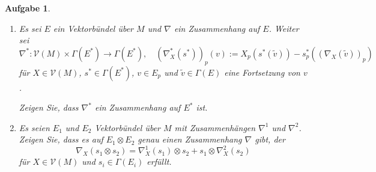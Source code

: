 \documentclass[paper=A4, twoside, chapterprefix=true, bibliography=totoc, headsepline]{scrbook}
\newcommand{\tensor}{\otimes}
\theoremstyle{plain}
\theoremstyle{nonumberplain}
\theoremstyle{empty}
\theoremstyle{break}
\newtheorem{Aufg}{Aufgabe}
\begin{document}
\begin{Aufg}
\begin{enumerate}[label=\alph*),leftmargin=*,widest=b]
\item
	Es sei $E$ ein Vektorbündel über $M$ und $\nabla$ ein Zusammenhang auf $E$. Weiter sei 
		\[\nabla^*:\mathcal{V}(M)\times \Gamma(E^*) \to \Gamma(E^*), \quad (\nabla^*_X(s^*))_p(v):=X_p(s^*(\tilde{v}))-s^*_p((\nabla_X(\tilde{v}))_p)\]
	für $X\in \mathcal{V}(M)$, $s^* \in \Gamma(E^*)$, $v \in E_p$ und $\tilde{v}\in \Gamma(E)$ eine Fortsetzung von $v$. 

	Zeigen Sie, dass $\nabla^*$ ein Zusammenhang auf $E^*$ ist.
\item
	Es seien $E_1$ und $E_2$ Vektorbündel über $M$ mit Zusammenhängen $\nabla^1$ und $\nabla^2$. Zeigen Sie, dass es auf $E_1 \tensor E_2$ genau einen Zusammenhang $\nabla$ gibt, der  \[\nabla_X(s_1 \tensor s_2)=\nabla^1_X(s_1) \tensor s_2 + s_1 \tensor \nabla^2_X(s_2)\] für $X \in \mathcal{V}(M)$ und $s_i \in \Gamma(E_i)$ erfüllt.
\end{enumerate}\end{Aufg}
\end{document}

